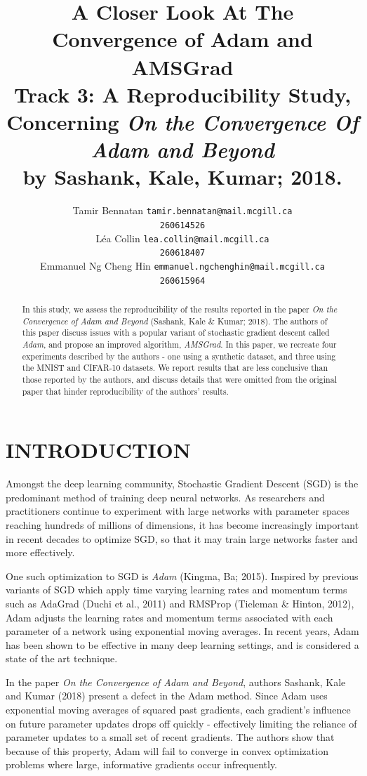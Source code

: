 \documentclass[letterpaper, 10 pt, conference]{ieeeconf}  %
\title{
A Closer Look At The Convergence of Adam and AMSGrad \\
\large Track 3: A Reproducibility Study, Concerning \emph{On the Convergence Of Adam and Beyond} \\
by Sashank, Kale, Kumar; 2018.
}
\author{ 
	\parbox{2 in}{\centering Tamir Bennatan
         {\tt\small tamir.bennatan@mail.mcgill.ca\\}
         {\tt\small 260614526}}
         \hspace*{ 0.3 in}
         \parbox{2 in}{\centering L\'ea Collin
         {\tt\small lea.collin@mail.mcgill.ca\\}
         {\tt\small 260618407}}
         \hspace*{0.3 in}
         \parbox{2 in}{\centering Emmanuel Ng Cheng Hin
         {\tt\small emmanuel.ngchenghin@mail.mcgill.ca\\}
         {\tt\small 260615964}}
}
\begin{document}
\maketitle
\thispagestyle{empty}
\pagestyle{empty}

\begin{abstract}
In this study, we assess the reproducibility of the results reported in the paper \emph{On the Convergence of Adam and Beyond} (Sashank, Kale \& Kumar; 2018). The authors of this paper discuss issues with a popular variant of stochastic gradient descent called \emph{Adam}, and propose an improved algorithm, \emph{AMSGrad}. In this paper, we recreate four experiments described by the authors - one using a synthetic dataset, and three using the MNIST and CIFAR-10 datasets. We report results that are less conclusive than those reported by the authors, and discuss details that were omitted from the original paper that hinder reproducibility of the authors' results.
\end{abstract}

\section{INTRODUCTION}

Amongst the deep learning community, Stochastic Gradient Descent (SGD) is the predominant method of training deep neural networks. As researchers and practitioners continue to experiment with large networks with parameter spaces reaching hundreds of millions of dimensions, it has become increasingly important in recent decades to optimize SGD, so that it may train large networks faster and more effectively. 

One such optimization to SGD is \emph{Adam} (Kingma, Ba; 2015). Inspired by previous variants of SGD which  apply time varying learning rates and momentum terms such as AdaGrad (Duchi et al.,
2011) and RMSProp (Tieleman \& Hinton, 2012), Adam adjusts the learning rates and momentum terms associated with each parameter of a network using exponential moving averages. In recent years, Adam has been shown to be effective in many deep learning settings, and is considered a state of the art technique. 

In the paper \emph{On the Convergence of Adam and Beyond}, authors Sashank, Kale and Kumar (2018) present a defect in the Adam method. Since Adam uses exponential moving averages of squared past gradients, each gradient's influence on future parameter updates drops off quickly - effectively limiting the reliance of parameter updates to a small set of recent gradients. The authors show that because of this property, Adam will fail to converge in convex optimization problems where large, informative gradients occur infrequently. 
\end{document}
